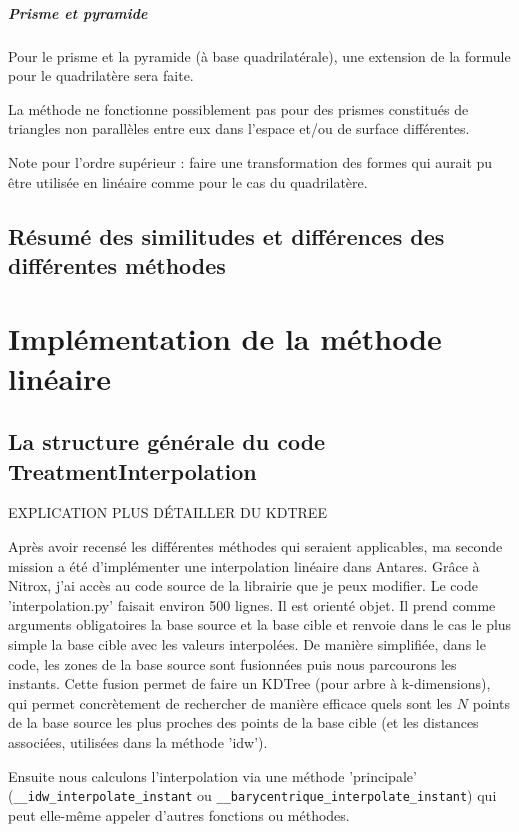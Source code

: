 \subparagraph{Prisme et pyramide}

Pour le prisme et la pyramide (à base quadrilatérale), une extension de la formule pour le quadrilatère sera faite.


La méthode ne fonctionne possiblement pas pour des prismes constitués de triangles non parallèles entre eux dans l'espace et/ou de surface différentes.


Note pour l'ordre supérieur : faire une transformation des formes qui aurait pu être utilisée en linéaire comme pour le cas du quadrilatère. \cite{camarero2024}



\subsection{Résumé des similitudes et différences des différentes méthodes}



\section{Implémentation de la méthode linéaire}

\subsection{La structure générale du code TreatmentInterpolation}

EXPLICATION PLUS DÉTAILLER DU KDTREE

Après avoir recensé les différentes méthodes qui seraient applicables, ma seconde mission a été d'implémenter une interpolation linéaire dans Antares. Grâce à Nitrox, j'ai accès au code source de la librairie que je peux modifier. Le code 'interpolation.py' faisait environ 500 lignes. Il est orienté objet. Il prend comme arguments obligatoires la base source et la base cible et renvoie dans le cas le plus simple la base cible avec les valeurs interpolées.
De manière simplifiée, dans le code, les zones de la base source sont fusionnées puis nous parcourons les instants. 
Cette fusion permet de faire un KDTree (pour arbre à k-dimensions), qui permet concrètement de rechercher de manière efficace quels sont les \( N \) points de la base source les plus proches des points de la base cible (et les distances associées, utilisées dans la méthode 'idw').

Ensuite nous calculons l'interpolation via une méthode 'principale' (\lstinline{__idw_interpolate_instant} ou
\lstinline{__barycentrique_interpolate_instant}) qui peut elle-même appeler d'autres fonctions ou méthodes.

